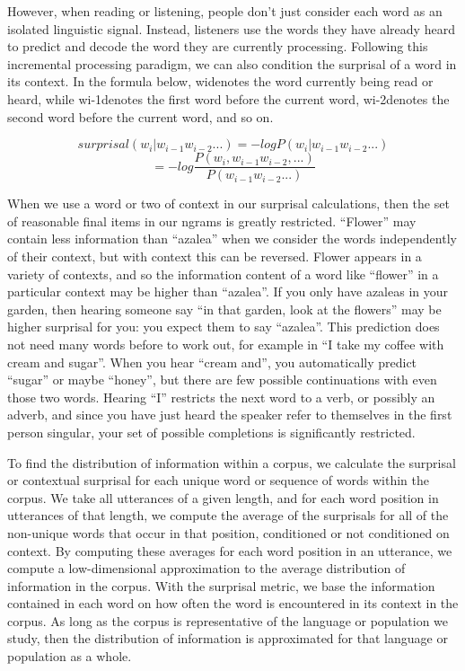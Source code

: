 \documentclass[11pt,]{article}
\begin{document}
However, when reading or listening, people don't just consider each word as an isolated linguistic signal. Instead, listeners use the words they have already heard to predict and decode the word they are currently processing. Following this incremental processing paradigm, we can also condition the surprisal of a word in its context. In the formula below, widenotes the word currently being read or heard, while wi-1denotes the first word before the current word, wi-2denotes the second word before the current word, and so on.

\[surprisal(w_i|w_{i-1}w_{i-2}...) = -log P(w_i|w_{i-1}w_{i-2}...)\]
\[= -log \frac{P(w_i,w_{i-1}w_{i-2},...)}{P(w_{i-1}w_{i-2}...)}\]

When we use a word or two of context in our surprisal calculations, then the set of reasonable final items in our ngrams is greatly restricted. ``Flower'' may contain less information than ``azalea'' when we consider the words independently of their context, but with context this can be reversed. Flower appears in a variety of contexts, and so the information content of a word like ``flower'' in a particular context may be higher than ``azalea''. If you only have azaleas in your garden, then hearing someone say ``in that garden, look at the flowers'' may be higher surprisal for you: you expect them to say ``azalea''. This prediction does not need many words before to work out, for example in ``I take my coffee with cream and sugar''. When you hear ``cream and'', you automatically predict ``sugar'' or maybe ``honey'', but there are few possible continuations with even those two words. Hearing ``I'' restricts the next word to a verb, or possibly an adverb, and since you have just heard the speaker refer to themselves in the first person singular, your set of possible completions is significantly restricted.

To find the distribution of information within a corpus, we calculate the surprisal or contextual surprisal for each unique word or sequence of words within the corpus. We take all utterances of a given length, and for each word position in utterances of that length, we compute the average of the surprisals for all of the non-unique words that occur in that position, conditioned or not conditioned on context. By computing these averages for each word position in an utterance, we compute a low-dimensional approximation to the average distribution of information in the corpus. With the surprisal metric, we base the information contained in each word on how often the word is encountered in its context in the corpus. As long as the corpus is representative of the language or population we study, then the distribution of information is approximated for that language or population as a whole.
\end{document}
